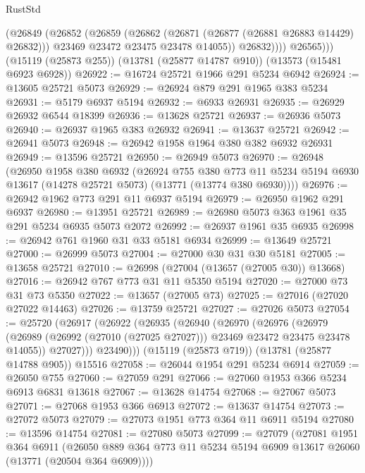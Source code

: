 \begin{lexlean}{RustStd}
\begin{coremodule}
                (@26849
                  (@26852
                    (@26859
                      (@26862 (@26871 (@26877 (@26881 @26883 @14429) @26832)))
                      @23469
                      @23472
                      @23475
                      @23478
                      @14055))
                  @26832))))
          @26565)))
    (@15119 (@25873 @255))
    (@13781 (@25877 @14787 @910))
    (@13573 (@15481 @6923 @6928))
@26922 := @16724 @25721 @1966 @291 @5234 @6942
@26924 := @13605 @25721 @5073
@26929 := @26924 @879 @291 @1965 @383 @5234
@26931 := @5179 @6937 @5194
@26932 := @6933 @26931
@26935 := @26929 @26932 @6544 @18399
@26936 := @13628 @25721
@26937 := @26936 @5073
@26940 := @26937 @1965 @383 @26932
@26941 := @13637 @25721
@26942 := @26941 @5073
@26948 := @26942 @1958 @1964 @380 @382 @6932 @26931
@26949 := @13596 @25721
@26950 := @26949 @5073
@26970 := @26948
    (@26950
      @1958
      @380
      @6932
      (@26924
        @755
        @380
        @773
        @11
        @5234
        @5194
        @6930
        @13617
        (@14278 @25721 @5073)
        (@13771 (@13774 @380 @6930))))
@26976 := @26942 @1962 @773 @291 @11 @6937 @5194
@26979 := @26950 @1962 @291 @6937
@26980 := @13951 @25721
@26989 := @26980 @5073 @363 @1961 @35 @291 @5234 @6935 @5073 @2072
@26992 := @26937 @1961 @35 @6935
@26998 := @26942 @761 @1960 @31 @33 @5181 @6934
@26999 := @13649 @25721
@27000 := @26999 @5073
@27004 := @27000 @30 @31 @30 @5181
@27005 := @13658 @25721
@27010 := @26998 (@27004 (@13657 (@27005 @30)) @13668)
@27016 := @26942 @767 @773 @31 @11 @5350 @5194
@27020 := @27000 @73 @31 @73 @5350
@27022 := @13657 (@27005 @73)
@27025 := @27016 (@27020 @27022 @14463)
@27026 := @13759 @25721
@27027 := @27026 @5073
@27054 := @25720
    (@26917
      (@26922
        (@26935
          (@26940
            (@26970
              (@26976
                (@26979
                  (@26989 (@26992 (@27010 (@27025 @27027))) @23469 @23472 @23475 @23478 @14055))
                @27027)))
          @23490)))
    (@15119 (@25873 @719))
    (@13781 (@25877 @14788 @905))
    @15516
@27058 := @26044 @1954 @291 @5234 @6914
@27059 := @26050 @755
@27060 := @27059 @291
@27066 := @27060 @1953 @366 @5234 @6913 @6831 @13618
@27067 := @13628 @14754
@27068 := @27067 @5073
@27071 := @27068 @1953 @366 @6913
@27072 := @13637 @14754
@27073 := @27072 @5073
@27079 := @27073 @1951 @773 @364 @11 @6911 @5194
@27080 := @13596 @14754
@27081 := @27080 @5073
@27099 := @27079
    (@27081
      @1951
      @364
      @6911
      (@26050 @889 @364 @773 @11 @5234 @5194 @6909 @13617 @26060 (@13771 (@20504 @364 @6909))))

\end{coremodule}
\end{lexlean}
